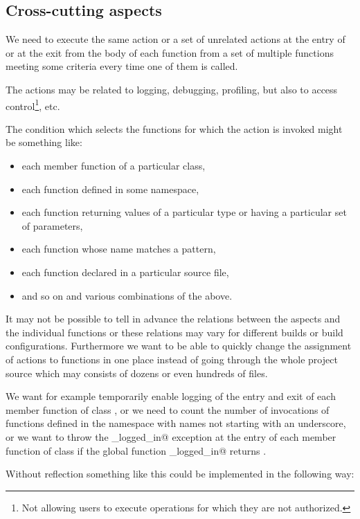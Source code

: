 \subsection{Cross-cutting aspects}

We need to execute the same action or a set of unrelated actions at the entry of
or at the exit from the body of each function from a set of multiple functions
meeting some criteria every time one of them is called.

The actions may be related to logging, debugging, profiling, but also to access
control\footnote{Not allowing users to execute operations for which they
are not authorized.}, etc.

The condition which selects the functions for which the action is invoked might
be something like:
\begin{itemize}
\item each member function of a particular class,
\item each function defined in some namespace,
\item each function returning values of a particular type or having
	a particular set of parameters,
\item each function whose name matches a pattern,
\item each function declared in a particular source file,
\item and so on and various combinations of the above.
\end{itemize}

It may not be possible to tell in advance the relations between the aspects
and the individual functions or these relations may vary for different builds
or build configurations.
Furthermore we want to be able to quickly change the assignment of actions to
functions in one place instead of going through the whole project source which
may consists of dozens or even hundreds of files.

We want for example temporarily enable logging of the entry and exit of each member
function of class \verb@foo@,
or we need to count the number of invocations of functions defined in the \verb@bar@
namespace with names not starting with an underscore, or we want to throw
the \verb@not_logged_in@ exception at the entry of each member function
of class \verb@secure@ if the global function \verb@user_logged_in@ returns \verb@false@.

Without reflection something like this could be implemented in the following way:

